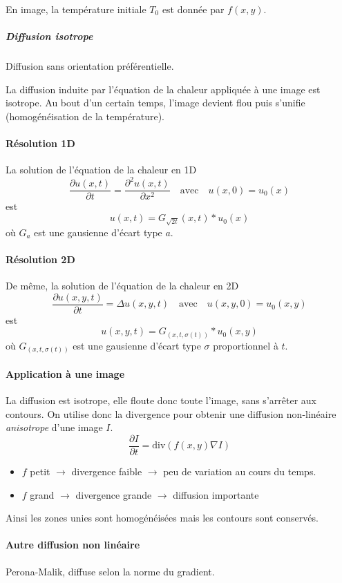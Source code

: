 \documentclass[french]{article}
\begin{document}
En image, la température initiale $T_0$ est donnée par $f(x,y)$.

\subparagraph{Diffusion isotrope} Diffusion sans orientation préférentielle.

La diffusion induite par l'équation de la chaleur appliquée à une image
est isotrope. Au bout d'un certain temps, l'image devient flou puis s'unifie
(homogénéisation de la température).

\paragraph{Résolution 1D} La solution de l'équation de la chaleur en 1D
$$ \frac{\partial u(x,t)}{\partial t} = \frac{\partial^2 u(x,t)}{\partial x ^2}
\quad\text{avec}\quad u(x,0) = u_0(x)$$
est $$u(x,t) = G_{\sqrt{2t}}(x,t) * u_0(x)$$
où $G_{a}$ est une gausienne d'écart type $a$.

\paragraph{Résolution 2D} De même, la solution de l'équation de la
chaleur en 2D
$$ \frac{\partial u(x,y,t)}{\partial t} = \Delta u(x,y,t)
\quad\text{avec}\quad u(x,y,0) = u_0(x,y)$$
est $$u(x,y,t) = G_(x,t,\sigma (t)) * u_0(x,y)$$
où $G_(x,t,\sigma (t))$ est une gausienne d'écart type $\sigma$
proportionnel à $t$.

\paragraph{Application à une image}La diffusion est isotrope, elle floute
donc toute l'image, sans s'arrêter aux contours. On utilise donc la divergence
pour obtenir une diffusion non-linéaire \emph{anisotrope} d'une image $I$.
$$\frac{\partial I}{\partial t} = \text{div} \left(f(x,y)\nabla I \right)$$
\begin{itemize}
\item $f$ petit $\to$ divergence faible $\to$ peu de variation au cours
du temps.
\item $f$ grand $\to$ divergence grande $\to$ diffusion importante
\end{itemize}
Ainsi les zones unies sont homogénéisées mais les contours sont conservés.

\paragraph{Autre diffusion non linéaire}Perona-Malik, diffuse selon la
norme du gradient.
\end{document}
